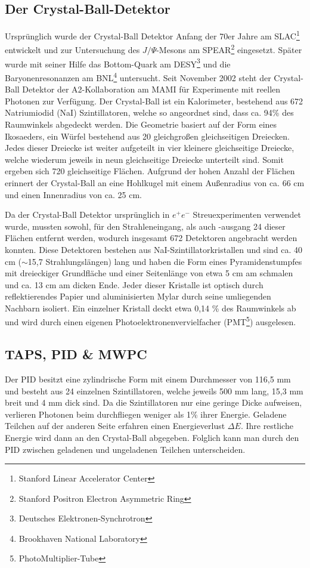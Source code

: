 \documentclass[a4paper,11pt,oneside,final,german,openbib,pdftex]{scrbook}
\begin{document}
{\subsection{Der Crystal-Ball-Detektor}
Ursprünglich wurde der Crystal-Ball Detektor Anfang der 70er Jahre am SLAC\footnote{Stanford Linear Accelerator Center} entwickelt und zur Untersuchung des $J/\Psi$-Mesons am SPEAR\footnote{Stanford Positron Electron Asymmetric Ring} eingesetzt. Später wurde mit seiner Hilfe das Bottom-Quark am DESY\footnote{Deutsches Elektronen-Synchrotron} und die Baryonenresonanzen am BNL\footnote{Brookhaven National Laboratory} untersucht.
Seit November 2002 steht der Crystal-Ball Detektor der A2-Kollaboration am MAMI für Experimente mit reellen Photonen zur Verfügung.
\newline
Der Crystal-Ball ist ein Kalorimeter, bestehend aus 672 Natriumiodid (NaI) Szintillatoren, welche so angeordnet sind, dass ca. 94\% des Raumwinkels abgedeckt werden. Die Geometrie basiert auf der Form eines Ikosaeders, ein W\"urfel bestehend aus 20 gleichgro{\ss}en gleichseitigen Dreiecken. Jedes dieser Dreiecke ist weiter aufgeteilt in vier kleinere gleichseitige Dreiecke, welche wiederum jeweils in neun gleichseitige Dreiecke unterteilt sind. Somit ergeben sich 720 gleichseitige Fl\"achen. Aufgrund der hohen Anzahl der Fl\"achen erinnert der Crystal-Ball an eine Hohlkugel mit einem Au{\ss}enradius von ca. 66 cm und einen Innenradius von ca. 25 cm. 

Da der Crystal-Ball Detektor urspr\"unglich in $e^+e^-$ Streuexperimenten verwendet wurde, mussten sowohl, f\"ur den Strahleneingang, als auch -ausgang 24 dieser Fl\"achen entfernt werden, wodurch insgesamt 672 Detektoren angebracht werden konnten. Diese Detektoren bestehen aus NaI-Szintillatorkristallen und sind ca. 40 cm ($\sim$15,7 Strahlungsl\"angen) lang und haben die Form eines Pyramidenstumpfes mit dreieckiger Grundfl\"ache und einer Seitenl\"ange von etwa 5 cm am schmalen und ca. 13 cm am dicken Ende. Jeder dieser Kristalle ist optisch durch reflektierendes Papier und aluminisierten Mylar durch seine umliegenden Nachbarn isoliert. Ein einzelner Kristall deckt etwa 0,14 \% des Raumwinkels ab und wird durch einen eigenen Photoelektronenvervielfacher (PMT\footnote{PhotoMultiplier-Tube}) ausgelesen. 



\subsection{TAPS, PID \& MWPC}
\label{sec:TAPS-PID-MWPC}
Der PID besitzt eine zylindrische Form mit einem Durchmesser von 116,5 mm und besteht aus 24 einzelnen Szintillatoren, welche jeweils 500 mm lang, 15,3 mm breit und 4 mm dick sind. Da die Szintillatoren nur eine geringe Dicke aufweisen, verlieren Photonen beim durchfliegen weniger als 1\% ihrer Energie. Geladene Teilchen auf der anderen Seite erfahren einen Energieverlust $\Delta E$. Ihre restliche Energie wird dann an den Crystal-Ball abgegeben. Folglich kann man durch den PID zwischen geladenen und ungeladenen Teilchen unterscheiden. 

}
\end{document}

